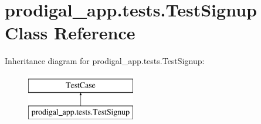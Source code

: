 \hypertarget{classprodigal__app_1_1tests_1_1_test_signup}{}\section{prodigal\+\_\+app.\+tests.\+Test\+Signup Class Reference}
\label{classprodigal__app_1_1tests_1_1_test_signup}
Inheritance diagram for prodigal\+\_\+app.\+tests.\+Test\+Signup\+:\begin{figure}[H]
\begin{center}
\leavevmode
\includegraphics[height=2.000000cm]{classprodigal__app_1_1tests_1_1_test_signup}
\end{center}
\end{figure}
